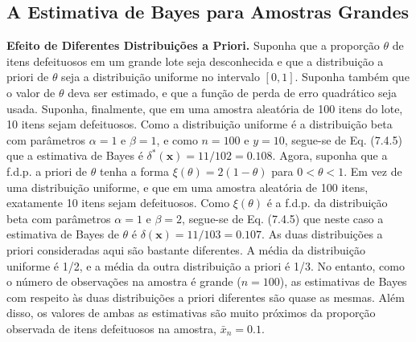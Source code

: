 \subsection*{A Estimativa de Bayes para Amostras Grandes}
\noindent\textbf{Efeito de Diferentes Distribuições a Priori.} Suponha que a proporção $\theta$ de itens defeituosos em um grande lote seja desconhecida e que a distribuição a priori de $\theta$ seja a distribuição uniforme no intervalo $[0, 1]$. Suponha também que o valor de $\theta$ deva ser estimado, e que a função de perda de erro quadrático seja usada. Suponha, finalmente, que em uma amostra aleatória de 100 itens do lote, 10 itens sejam defeituosos. Como a distribuição uniforme é a distribuição beta com parâmetros $\alpha=1$ e $\beta=1$, e como $n=100$ e $y=10$, segue-se de Eq. (7.4.5) que a estimativa de Bayes é $\delta^*(\mathbf{x}) = 11/102 = 0.108$.
Agora, suponha que a f.d.p. a priori de $\theta$ tenha a forma $\xi(\theta) = 2(1-\theta)$ para $0<\theta<1$. Em vez de uma distribuição uniforme, e que em uma amostra aleatória de 100 itens, exatamente 10 itens sejam defeituosos. Como $\xi(\theta)$ é a f.d.p. da distribuição beta com parâmetros $\alpha=1$ e $\beta=2$, segue-se de Eq. (7.4.5) que neste caso a estimativa de Bayes de $\theta$ é $\delta(\mathbf{x})=11/103=0.107$.
As duas distribuições a priori consideradas aqui são bastante diferentes. A média da distribuição uniforme é 1/2, e a média da outra distribuição a priori é 1/3. No entanto, como o número de observações na amostra é grande ($n=100$), as estimativas de Bayes com respeito às duas distribuições a priori diferentes são quase as mesmas. Além disso, os valores de ambas as estimativas são muito próximos da proporção observada de itens defeituosos na amostra, $\bar{x}_n = 0.1$.

